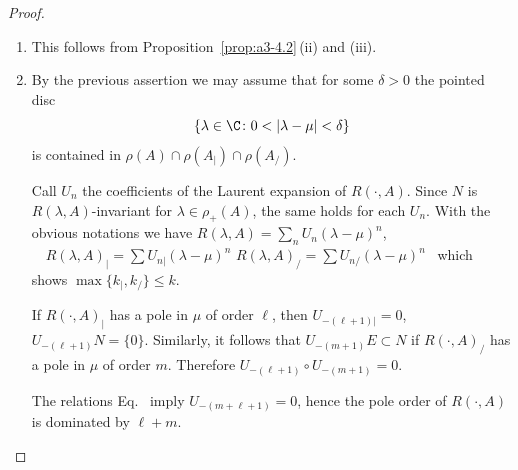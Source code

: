 \begin{proof}
\begin{enumerate}[\upshape (i), wide, labelindent=.25em]
\item 
This follows from Proposition~\ref{prop:a3-4.2}\,(ii) and (iii).

\item 
By the previous assertion we may assume that for some $\delta > 0$ the pointed disc
\[
\{\lambda \in \C \colon 0 < |\lambda-\mu| < \delta\}
\]
is contained in $\rho(A) \cap \rho(A_{|}) \cap \rho(A_{/})$.

Call $U_{n}$ the coefficients of the Laurent expansion of\/ $R(\cdot,A)$.
Since $N$ is $R(\lambda,A)$-invariant for $\lambda \in \rho_{+}(A)$, the same holds for each $U_{n}$.
With the obvious notations we have \quad
$R(\lambda,A) = \sum_{n} U_{n}(\lambda-\mu)^{n}$, $\quad R(\lambda,A)_{|} = \sum U_{n|}(\lambda-\mu)^{n}$ \quad {} \quad $R(\lambda,A)_{/} = \sum U_{n/}(\lambda-\mu)^{n}$~
which shows $\max\{k_{|},k_{/}\} \leq k$.

If\/ $R(\cdot,A)_{|}$ has a pole in $\mu$ of order $\ell$, then $U_{-(\ell+1)|} = 0$, \ie $U_{-(\ell+1)}N = \{0\}$.
Similarly, it follows that $U_{-(m+1)}E \subset N$ if\/ $R(\cdot,A)_{/}$ has a pole in $\mu$ of order $m$.
Therefore $U_{-(\ell+1)} \circ U_{-(m+1)} = 0$.

The relations Eq.~ imply $U_{-(m+\ell+1)} = 0$, hence the pole order of\/ $R(\cdot,A)$ is dominated by $\ell + m$.
\qedhere
\end{enumerate}
\end{proof}
